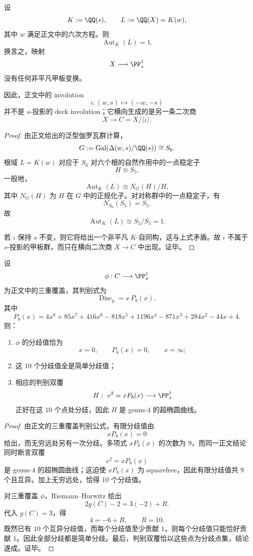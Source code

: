 \begin{theorem}\label{thm:conclusion-sprojection-deck-group-triviality}
设
\[
K:=\QQ(s),
\qquad
L:=\QQ(X)=K(w),
\]
其中 \(w\) 满足正文中的六次方程。则
\[
\operatorname{Aut}_K(L)=1.
\]
换言之，映射
\[
X\longrightarrow \PP^1_s
\]
没有任何非平凡甲板变换。

因此，正文中的 involution
\[
\iota:(w,s)\mapsto (-w,-s)
\]
并不是 \(s\)-投影的 deck involution；它横向生成的是另一条二次商
\[
X\to C=X/\langle \iota\rangle.
\]
\end{theorem}
\begin{proof}
由正文给出的泛型伽罗瓦群计算，
\[
G:=\operatorname{Gal}(\Delta(w,s)/\QQ(s))\cong S_6.
\]
根域 \(L=K(w)\) 对应于 \(S_6\) 对六个根的自然作用中的一点稳定子
\[
H\cong S_5.
\]
一般地，
\[
\operatorname{Aut}_K(L)\cong N_G(H)/H,
\]
其中 \(N_G(H)\) 为 \(H\) 在 \(G\) 中的正规化子。对对称群中的一点稳定子，有
\[
N_{S_6}(S_5)=S_5.
\]
故
\[
\operatorname{Aut}_K(L)\cong S_5/S_5=1.
\]

若 \(\iota\) 保持 \(s\) 不变，则它将给出一个非平凡 \(K\)-自同构，这与上式矛盾。故 \(\iota\) 不属于 \(s\)-投影的甲板群，而只在横向二次商 \(X\to C\) 中出现。证毕。
\end{proof}

\begin{theorem}\label{thm:conclusion-cubic-cover-ten-simple-branchpoints-discriminant-double-cover}
设
\[
\phi:C\longrightarrow \PP^1_x
\]
为正文中的三重覆盖，其判别式为
\[
\operatorname{Disc}_y=x\,P_8(x),
\]
其中
\[
P_8(x)=4x^8+85x^7+416x^6-818x^5+1196x^4-871x^3+284x^2-44x+4.
\]
则：
\begin{enumerate}
  \item \(\phi\) 的分歧值恰为
  \[
  x=0,\qquad P_8(x)=0,\qquad x=\infty;
  \]
  \item 这 \(10\) 个分歧值全是简单分歧值；
  \item 相应的判别双覆
  \[
  H:\ v^2=xP_8(x)\longrightarrow \PP^1_x
  \]
  正好在这 \(10\) 个点处分歧，因此 \(H\) 是 genus-\(4\) 的超椭圆曲线。
\end{enumerate}
\end{theorem}
\begin{proof}
由正文的三重覆盖判别公式，有限分歧值由
\[
xP_8(x)=0
\]
给出，而无穷远处另有一次分歧。多项式 \(xP_8(x)\) 的次数为 \(9\)，而同一正文结论同时断言双覆
\[
v^2=xP_8(x)
\]
是 genus-\(4\) 的超椭圆曲线；这迫使 \(xP_8(x)\) 为 squarefree，因此有限分歧值共 \(9\) 个且互异。加上无穷远处，恰得 \(10\) 个分歧值。

对三重覆盖 \(\phi\)，Riemann--Hurwitz 给出
\[
2g(C)-2=3(-2)+R.
\]
代入 \(g(C)=3\)，得
\[
4=-6+R,
\qquad
R=10.
\]
既然已有 \(10\) 个互异分歧值，而每个分歧值至少贡献 \(1\)，则每个分歧值只能恰好贡献 \(1\)。因此全部分歧都是简单分歧。最后，判别双覆恰以这些点为分歧点集，结论遂成。证毕。
\end{proof}

